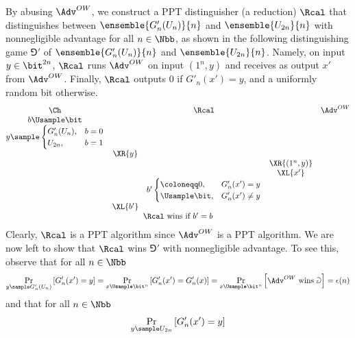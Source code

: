 \begin{answer}[b]
    By abusing $\Adv^{OW}$, we construct a PPT distinguisher (a reduction) $\Rcal$ that distinguishes between $\ensemble{G'_n(U_n)}{n}$ and $\ensemble{U_{2n}}{n}$ with nonnegligible advantage for all $n\in\Nbb$, as shown in the following distinguishing game $\Game'$ of $\ensemble{G'_n(U_n)}{n}$ and $\ensemble{U_{2n}}{n}$.
    Namely, on input $y\in\bit^{2n}$, $\Rcal$ runs $\Adv^{OW}$ on input $(1^n, y)$ and receives as output $x'$ from $\Adv^{OW}$. Finally,  $\Rcal$ outputs $0$ if $G'_n(x')=y$, and a uniformly  random bit otherwise.
    {
        \[
            \begin{array}{@{} c c c c c@{}}
            \Ch & & \Rcal & & \Adv^{OW} \\
            b \Usample \bit & & & & \\
            y \sample \begin{cases} 
                G'_n(U_n), &b = 0 \\
                U_{2n}, &b = 1 
            \end{cases} & & & & \\
            & \XR{y} & & & \\
            & & & \XR{(1^n, y)} & \\
            & & &\XL{x'} & \\
            & & b' \begin{cases}
                \coloneqq 0, & G'_n(x')=y\\
                \Usample\bit, & G'_n(x')\neq y
            \end{cases} & & \\
            & \XL{b'} & & & \\
            \multicolumn{5}{c}{\text{$\Rcal$ wins if $b' = b$}}
        \end{array}
        \]
        \label{fig:p3-game4}
    }
    Clearly, $\Rcal$ is a PPT algorithm since $\Adv^{OW}$ is a PPT algorithm. We are now left to show that $\Rcal$ wins $\Game'$ with nonnegligible advantage. To see this, observe that for all $n\in\Nbb$
    \begin{equation}\label{eq:p3-2-1}
        \Pr_{y \sample G'_n(U_n)}\left[G'_n(x')=y  \right]
        = \Pr_{x \Usample \bit^n}\left[G'_n(x')=G'_n(x) \right]
        = \Pr_{x \Usample \bit^n}\left[\Adv^{OW} \textrm{ wins } \Game \right]
        =\epsilon(n)
    \end{equation}
    and that for all $n\in\Nbb$
    \begin{equation}\label{eq:p3-2-2}
        \Pr_{y \sample U_{2n}}\left[G'_n(x')=y  \right]

\end{equation}
\end{answer}

